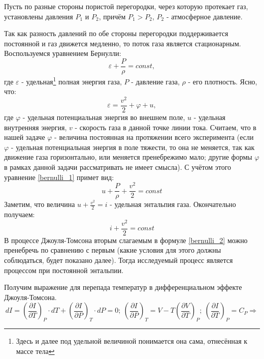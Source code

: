 \documentclass[15pt,a5paper,reqno]{article}
\begin{document}
    Пусть по разные стороны пористой перегородки, через которую протекает газ, установлены давления $P_1$ и $P_2$, причём $P_1 > P_2$, $P_2$ - атмосферное давление.
    
    Так как разность давлений по обе стороны перегородки поддерживается постоянной и газ движется медленно, то поток газа является стационарным. Воспользуемся уравнением Бернулли:
    \begin{equation}\label{bernulli_1}
        \varepsilon + \frac{P}{\rho} = const,
    \end{equation}
    где $\varepsilon$ - удельная\footnote{Здесь и далее под удельной величиной понимается она сама, отнесённая к массе тела} полная энергия газа, $P$ - давление газа, $\rho$ - его плотность. Ясно, что:
    \begin{equation}
        \varepsilon = \frac{v^2}{2} + \varphi + u,
    \end{equation}
    где $\varphi$ - удельная потенциальная энергия во внешнем поле, $u$ - удельная внутренняя энергия, $v$ - скорость газа в данной точке линии тока. Считаем, что в нашей задаче $\varphi$ - величина постоянная на протяжении всего эксперимента (если $\varphi$ - удельная потенциальная энергия в поле тяжести, то она не меняется, так как движение газа горизонтально, или меняется пренебрежимо мало; другие формы $\varphi$ в рамках данной задачи рассматривать не имеет смысла). С учётом этого уравнение \eqref{bernulli_1} примет вид:
    \begin{equation}
        u + \frac{P}{\rho} + \frac{v^2}{2} = const
    \end{equation}
    Заметим, что величина $u + \frac{v^2}{2} = i$ - удельная энтальпия газа. Окончательно получаем:
    \begin{equation}\label{bernulli_2}
        i + \frac{v^2}{2} = const
    \end{equation}
    В процессе Джоуля-Томсона вторым слагаемым в формуле \eqref{bernulli_2} можно пренебречь по сравнению с первым (какие условия для этого должны соблюдаться, будет показано далее). Тогда исследуемый процесс является процессом при постоянной энтальпии.
    
    Получим выражение для перепада температур в дифференциальном эффекте Джоуля-Томсона.
    \[dI = \left(\frac{\partial I}{\partial T}\right)_P\cdot dT + \left(\frac{\partial I}{\partial P}\right)_T\cdot dP = 0;\ \left(\frac{\partial I}{\partial P}\right)_T = V - T\left(\frac{\partial V}{\partial T}\right)_P;\ \left(\frac{\partial I}{\partial T}\right)_P = C_P \Rightarrow\]
    
\end{document}
